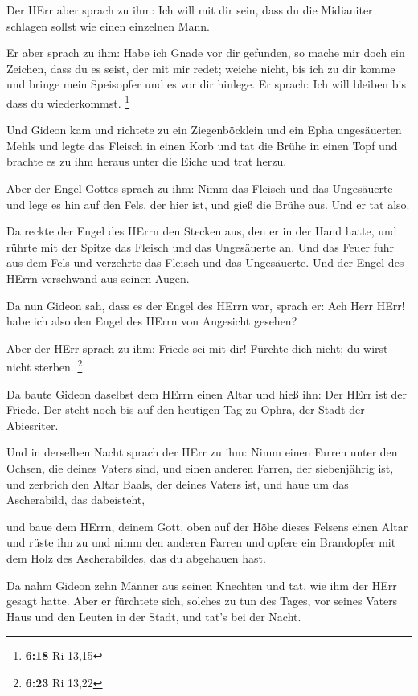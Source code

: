  Der HErr aber sprach zu ihm: Ich will mit dir sein, dass
du die Midianiter schlagen sollst wie einen einzelnen Mann.

 Er aber sprach zu ihm: Habe ich Gnade vor dir gefunden, so
mache mir doch ein Zeichen, dass du es seist, der mit mir redet;
 weiche nicht, bis ich zu dir komme und bringe mein
Speisopfer und es vor dir hinlege. Er sprach: Ich will bleiben bis dass
du wiederkommst. \footnote{\textbf{6:18} Ri 13,15}

 Und Gideon kam und richtete zu ein Ziegenböcklein und ein
Epha ungesäuerten Mehls und legte das Fleisch in einen Korb und tat die
Brühe in einen Topf und brachte es zu ihm heraus unter die Eiche und
trat herzu.

 Aber der Engel Gottes sprach zu ihm: Nimm das Fleisch und
das Ungesäuerte und lege es hin auf den Fels, der hier ist, und gieß die
Brühe aus. Und er tat also.

 Da reckte der Engel des HErrn den Stecken aus, den er in
der Hand hatte, und rührte mit der Spitze das Fleisch und das
Ungesäuerte an. Und das Feuer fuhr aus dem Fels und verzehrte das
Fleisch und das Ungesäuerte. Und der Engel des HErrn verschwand aus
seinen Augen.

 Da nun Gideon sah, dass es der Engel des HErrn war, sprach
er: Ach Herr HErr! habe ich also den Engel des HErrn von Angesicht
gesehen?

 Aber der HErr sprach zu ihm: Friede sei mit dir! Fürchte
dich nicht; du wirst nicht sterben. \footnote{\textbf{6:23} Ri 13,22}

 Da baute Gideon daselbst dem HErrn einen Altar und hieß
ihn: Der HErr ist der Friede. Der steht noch bis auf den heutigen Tag zu
Ophra, der Stadt der Abiesriter.

 Und in derselben Nacht sprach der HErr zu ihm: Nimm einen
Farren unter den Ochsen, die deines Vaters sind, und einen anderen
Farren, der siebenjährig ist, und zerbrich den Altar Baals, der deines
Vaters ist, und haue um das Ascherabild, das dabeisteht,

 und baue dem HErrn, deinem Gott, oben auf der Höhe dieses
Felsens einen Altar und rüste ihn zu und nimm den anderen Farren und
opfere ein Brandopfer mit dem Holz des Ascherabildes, das du abgehauen
hast.

 Da nahm Gideon zehn Männer aus seinen Knechten und tat,
wie ihm der HErr gesagt hatte. Aber er fürchtete sich, solches zu tun
des Tages, vor seines Vaters Haus und den Leuten in der Stadt, und tat's
bei der Nacht.

